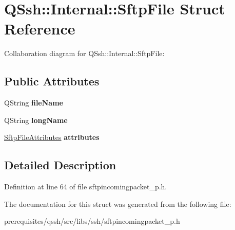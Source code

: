 \hypertarget{struct_q_ssh_1_1_internal_1_1_sftp_file}{}\section{Q\+Ssh\+:\+:Internal\+:\+:Sftp\+File Struct Reference}
\label{struct_q_ssh_1_1_internal_1_1_sftp_file}


Collaboration diagram for Q\+Ssh\+:\+:Internal\+:\+:Sftp\+File\+:
\subsection*{Public Attributes}
\begin{DoxyCompactItemize}
\item 
\mbox{\label{struct_q_ssh_1_1_internal_1_1_sftp_file_a8de6a8fecbb69b16b16987c8d79a7b1c}} 
Q\+String {\bfseries file\+Name}
\item 
\mbox{\label{struct_q_ssh_1_1_internal_1_1_sftp_file_a42e4da766fda529425df2eed257725f5}} 
Q\+String {\bfseries long\+Name}
\item 
\mbox{\label{struct_q_ssh_1_1_internal_1_1_sftp_file_ac980ab44f9a7a524c0bbe1b5a3a87ce9}} 
\mbox{\hyperlink{struct_q_ssh_1_1_internal_1_1_sftp_file_attributes}{Sftp\+File\+Attributes}} {\bfseries attributes}
\end{DoxyCompactItemize}


\subsection{Detailed Description}


Definition at line 64 of file sftpincomingpacket\+\_\+p.\+h.



The documentation for this struct was generated from the following file\+:\begin{DoxyCompactItemize}
\item 
prerequisites/qssh/src/libs/ssh/sftpincomingpacket\+\_\+p.\+h\end{DoxyCompactItemize}
